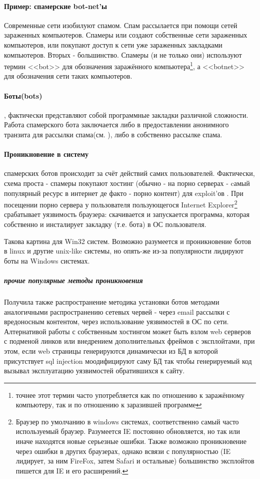 \paragraph{Пример: спамерские bot-net'ы}

Современные сети изобилуют спамом. Спам рассылается при помощи сетей
зараженных компьютеров. Спамеры или создают собственные сети зараженных
компьютеров, или покупают доступ к сети уже зараженных закладками
компьютеров. Вторых - большинство. Спамеры (и не только они) используют
термин  <<bot>> для обозначения заражённого компьютера\footnote{точнее
этот термин часто употребляется как по отношению к заражённому
компьютеру, так и по отношению к заразившей программе}, а <<botnet>>
для обозначения сети таких компьютеров.

\paragraph{Боты(bots)},
фактически представляют собой программные закладки различной сложности.
Работа спамерского бота заключается либо в предоставлении анонимного
транзита для рассылки спама(см. \pageref{bot_as_relay}),  либо в
собственно рассылке спама.

\paragraph{Проникновение в систему}
 спамерских ботов происходит за счёт действий самих пользователей.
Фактически, схема проста - спамеры покупают хостинг (обычно - на порно
серверах - cамый популярный ресурс в интернет де факто - порно
контент) для exploit'ов . При посещении порно сервера у пользователя
пользующегося Internet Explorer\footnote{Браузер по умолчанию в windows
системах, соответственно самый часто используемый браузер. Разумеется IE постоянно
обновляется, но так или иначе находятся новые серьезные ошибки. Также возможно
проникновение через ошибки в других браузерах, однако всвязи с популярностью (IE
лидирует, за ним FireFox, затем Safari и остальные) большинство эксплойтов
пишется для IE и его расширений.} срабатывает уязвимость браузера:
скачивается и запускается программа, которая собственно и инсталирует
закладку (т.е. бота) в ОС пользователя.

Такова картина для Win32 систем. Возможно разумеется и проникновение ботов в linux
 и другие unix-like системы, но опять-же из-за популярности лидируют боты на Windows
 системах.

\subparagraph{прочие популярные методы проникновения\\}
 Получила также распространение методика установки ботов методами аналогичными распространению сетевых червей - через
 email рассылки с вредоносным контентом, через использование уязвимостей в ОС по сети.\\
 Алтернативой работы с собственным хостингом может быть взлом web серверов с подменой линков или внедрением дополнительных фреймов с эксплойтами, при этом, если web страницы генерируются динамически из БД в которой
присутствует sql injection моодифицируют саму БД так чтобы генерируемый код вызывал эксплуатацию уязвимостей
обратившихся к сайту.\\


